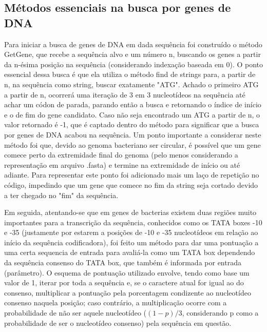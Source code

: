 \documentclass[brazilian,12pt,a4paper,final]{article}
\begin{document}
		\subsection{Métodos essenciais na busca por genes de DNA}
	Para iniciar a busca de genes de DNA em dada sequência foi construído o método GetGene, que recebe a sequência alvo e um número n, buscando os genes a partir da
	n-ésima posição na sequência (considerando indexação baseada em 0). O ponto essencial dessa busca é que ela utiliza o método find de strings para, a partir de n,
	na sequência como string, buscar exatamente "ATG". Achado o primeiro ATG a partir de n, ocorrerá uma iteração de 3 em 3 nucleotídeos na sequência até achar um 
	códon de parada, parando então a busca e retornando o índice de início e o de fim do gene candidato. Caso não seja encontrado um ATG a partir de n, o valor retornado
	é -1, que é captado dentro do método para significar que a busca por genes de DNA acabou na sequência. Um ponto importante a considerar neste método foi que, devido
	ao genoma bacteriano ser circular, é possível que um gene comece perto da extremidade final do genoma (pelo menos considerando a representação em arquivo .fasta) e termine
	na extremidade de início ou até adiante. Para representar este ponto foi adicionado mais um laço de repetição no código, impedindo que um gene que comece no fim da string 
	seja cortado devido a ter chegado no "fim" da sequência.
	
	\vspace{0.5cm}
	
	Em seguida, atentando-se que em genes de bacterias existem duas regiões muito importantes para a transcrição da sequência, conhecidos como os TATA boxes -10 e -35 (justamente por estarem a posições de -10 e -35 nucleotídeos em relação ao início da sequência codificadora), foi feito um método para dar uma pontuação a uma certa sequencia de entrada
	para avaliá-la como um TATA box dependendo da sequência consenso do TATA box, que também é informada por entrada (parâmetro). O esquema de pontuação utilizado envolve, tendo como base um valor de 1, iterar por toda a sequência e, se o caractere atual for igual ao do consenso, multiplicar a pontuação pela porcentagem condizente ao nucleotídeo consenso naquela posição; caso contrário, a multiplicação ocorre com a probabilidade de não ser aquele nucleotídeo (\((1-p)/3\), considerando p como a probabilidade de ser o nucleotídeo consenso)
	pela sequência em questão.
	
	\vspace{0.5cm}
	
\end{document}

